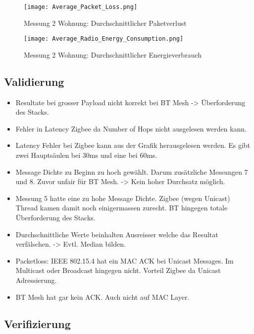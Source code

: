 \begin{figure}[!htbp]
\centering
\begin{minipage}[b]{0.49\textwidth}
		\centering
		\texttt{[image: Average\_Packet\_Loss.png]}
		\caption{Messung 2 Wohnung: Durchschnittlicher Paketverlust}
		\label{fig:DurchschnittlicherPaketverlust}
\end{minipage}
\begin{minipage}[b]{0.49\textwidth}
		\centering
		\texttt{[image: Average\_Radio\_Energy\_Consumption.png]}
		\caption{Messung 2 Wohnung: Durchschnittlicher Energieverbrauch}
		\label{fig:DurchschnittlicherEnergieverbrauch}
\end{minipage}
\end{figure}


\subsection{Validierung}\label{subsec:Validierung}



\begin{itemize}
\item Resultate bei grosser Payload nicht korrekt bei BT Mesh -> Überforderung des Stacks.

\item Fehler in Latency Zigbee da Number of Hops nicht ausgelesen werden kann.

\item Latency Fehler bei Zigbee kann aus der Grafik herausgelesen werden. Es gibt zwei Hauptsäulen bei 30ms und eine bei 60ms.

\item Message Dichte zu Beginn zu hoch gewählt. Darum zusätzliche Messungen 7 und 8. Zuvor unfair für BT Mesh. -> Kein hoher Durchsatz möglich.

\item Messung 5 hatte eine zu hohe Message Dichte. Zigbee (wegen Unicast) Thread kamen damit noch einigermassen zurecht. BT hingegen totale Überforderung des Stacks.

\item Durchschnittliche Werte beinhalten Ausreisser welche das Resultat verfälschen. -> Evtl. Median bilden.

\item Packetloss: IEEE 802.15.4 hat ein MAC ACK bei Unicast Messages. Im Multicast oder Broadcast hingegen nicht. Vorteil Zigbee da Unicast Adressierung.

\item BT Mesh hat gar kein ACK. Auch nicht auf MAC Layer.

\end{itemize}

\subsection{Verifizierung}\label{subsec:Verifizierung}







